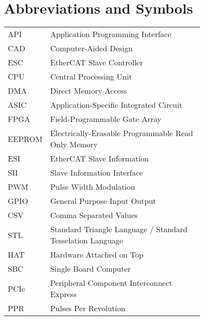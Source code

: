 \chapter*{Abbreviations and Symbols}

\begin{flushleft}
\begin{tabular}{l p{0.8\linewidth}}
API	& Application Programming Interface\\
CAD	& Computer-Aided Design\\
ESC	& EtherCAT Slave Controller\\
CPU	& Central Processing Unit\\
DMA	& Direct Memory Access\\
ASIC	& Application-Specific Integrated Circuit\\
FPGA	& Field-Programmable Gate Array\\
EEPROM	& Electrically-Erasable Programmable Read Only Memory\\
ESI	& EtherCAT Slave Information\\
SII	& Slave Information Interface\\
PWM	& Pulse Width Modulation\\
GPIO	& General Purpose Input Output\\
CSV	& Comma Separated Values\\
STL	& Standard Triangle Language / Standard Tesselation Language\\
HAT	& Hardware Attached on Top\\
SBC	& Single Board Computer\\
PCIe	& Peripheral Component Interconnect Express\\
PPR	& Pulses Per Revolution\\
\end{tabular}
\end{flushleft}

